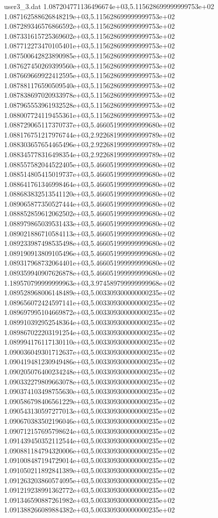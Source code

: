 \begin{filecontents}{user3_3.dat}
1.087204771136496674e+03,5.115628699999999753e+02
1.087162588626848219e+03,5.115628699999999753e+02
1.087289346576866592e+03,5.115628699999999753e+02
1.087331615725369602e+03,5.115628699999999753e+02
1.087712273470105401e+03,5.115628699999999753e+02
1.087500642823890985e+03,5.115628699999999753e+02
1.087627450269399560e+03,5.115628699999999753e+02
1.087669669922412595e+03,5.115628699999999753e+02
1.087881176590509540e+03,5.115628699999999753e+02
1.087838697020933978e+03,5.115628699999999753e+02
1.087965553961932528e+03,5.115628699999999753e+02
1.088007724119455361e+03,5.115628699999999753e+02
1.088729065117370737e+03,5.466051999999999680e+02
1.088176751217976744e+03,2.922681999999999789e+02
1.088303657654465496e+03,2.922681999999999789e+02
1.088345778316498354e+03,2.922681999999999789e+02
1.088557582044522405e+03,5.466051999999999680e+02
1.088514805415019737e+03,5.466051999999999680e+02
1.088641761346998464e+03,5.466051999999999680e+02
1.088683832513541120e+03,5.466051999999999680e+02
1.089065877350527444e+03,5.466051999999999680e+02
1.088852859612062502e+03,5.466051999999999680e+02
1.088979865039531433e+03,5.466051999999999680e+02
1.089021886710584113e+03,5.466051999999999680e+02
1.089233987498535498e+03,5.466051999999999680e+02
1.089190913809105496e+03,5.466051999999999680e+02
1.089317968732064401e+03,5.466051999999999680e+02
1.089359940907626878e+03,5.466051999999999680e+02
1.189570799999999963e+03,3.974589799999999968e+02
1.089528968006148489e+03,5.003309300000000235e+02
1.089656072424597141e+03,5.003309300000000235e+02
1.089697995104669872e+03,5.003309300000000235e+02
1.089910392952548364e+03,5.003309300000000235e+02
1.089867022203191254e+03,5.003309300000000235e+02
1.089994176117130110e+03,5.003309300000000235e+02
1.090036049301712637e+03,5.003309300000000235e+02
1.090419481230949486e+03,5.003309300000000235e+02
1.090205076400234248e+03,5.003309300000000235e+02
1.090332279809663078e+03,5.003309300000000235e+02
1.090374103498755630e+03,5.003309300000000235e+02
1.090586798406561229e+03,5.003309300000000235e+02
1.090543130597277013e+03,5.003309300000000235e+02
1.090670383502196046e+03,5.003309300000000235e+02
1.090712157695798624e+03,5.003309300000000235e+02
1.091439450352112544e+03,5.003309300000000235e+02
1.090881184794320006e+03,5.003309300000000235e+02
1.091008487194729014e+03,5.003309300000000235e+02
1.091050211892841389e+03,5.003309300000000235e+02
1.091263203860574095e+03,5.003309300000000235e+02
1.091219238991362772e+03,5.003309300000000235e+02
1.091346590887261982e+03,5.003309300000000235e+02
1.091388266089884382e+03,5.003309300000000235e+02

\end{filecontents}
